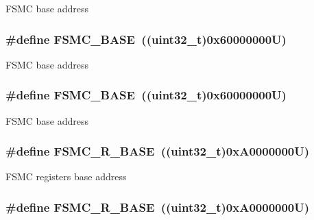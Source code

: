 F\-S\-M\-C base address \hypertarget{group___peripheral__memory__map_ga679200df61ecb0695d72c030fdeb50a9}{
\subsubsection[{F\-S\-M\-C\-\_\-\-B\-A\-S\-E}]{\setlength{\rightskip}{0pt plus 5cm}\#define F\-S\-M\-C\-\_\-\-B\-A\-S\-E~((uint32\-\_\-t)0x60000000\-U)}}\label{group___peripheral__memory__map_ga679200df61ecb0695d72c030fdeb50a9}
F\-S\-M\-C base address \hypertarget{group___peripheral__memory__map_ga679200df61ecb0695d72c030fdeb50a9}{
\subsubsection[{F\-S\-M\-C\-\_\-\-B\-A\-S\-E}]{\setlength{\rightskip}{0pt plus 5cm}\#define F\-S\-M\-C\-\_\-\-B\-A\-S\-E~((uint32\-\_\-t)0x60000000\-U)}}\label{group___peripheral__memory__map_ga679200df61ecb0695d72c030fdeb50a9}
F\-S\-M\-C base address \hypertarget{group___peripheral__memory__map_gaddf0e199dccba83272b20c9fb4d3aaed}{
\subsubsection[{F\-S\-M\-C\-\_\-\-R\-\_\-\-B\-A\-S\-E}]{\setlength{\rightskip}{0pt plus 5cm}\#define F\-S\-M\-C\-\_\-\-R\-\_\-\-B\-A\-S\-E~((uint32\-\_\-t)0x\-A0000000\-U)}}\label{group___peripheral__memory__map_gaddf0e199dccba83272b20c9fb4d3aaed}
F\-S\-M\-C registers base address \hypertarget{group___peripheral__memory__map_gaddf0e199dccba83272b20c9fb4d3aaed}{
\subsubsection[{F\-S\-M\-C\-\_\-\-R\-\_\-\-B\-A\-S\-E}]{\setlength{\rightskip}{0pt plus 5cm}\#define F\-S\-M\-C\-\_\-\-R\-\_\-\-B\-A\-S\-E~((uint32\-\_\-t)0x\-A0000000\-U)}}\label{group___peripheral__memory__map_gaddf0e199dccba83272b20c9fb4d3aaed}
